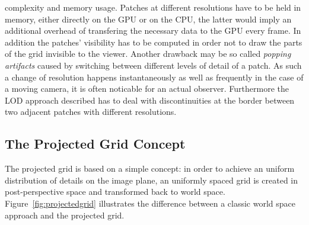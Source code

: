 complexity and memory usage. Patches at different resolutions have to be held
in memory, either directly on the GPU or on the CPU, the latter would imply an
additional overhead of transfering the necessary data to the GPU every frame.
In addition the patches' visibility has to be computed in order not to draw the
parts of the grid invisible to the viewer. Another drawback may be so called
\textit{popping artifacts} caused by switching between different levels of
detail of a patch. As such a change of resolution happens instantaneously as
well as frequently in the case of a moving camera, it is often noticable for an
actual observer. Furthermore the LOD approach described has to deal with
discontinuities at the border between two adjacent patches with different
resolutions.

\subsection{The Projected Grid Concept}
The projected grid is based on a simple concept: in order to achieve an
uniform distribution of details on the image plane, an uniformly spaced grid is
created in post-perspective space and transformed back to world space.
Figure~\ref{fig:projectedgrid} illustrates the difference between a classic
world space approach and the projected grid.
